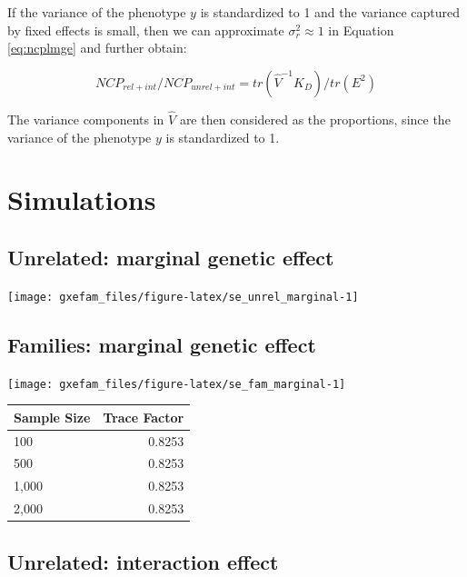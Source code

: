 \documentclass[]{book}
\begin{document}
If the variance of the phenotype \(y\) is standardized to 1 and the
variance captured by fixed effects is small, then we can approximate
\(\sigma_r^2 \approx 1\) in Equation \eqref{eq:ncplmge} and further
obtain:

\begin{equation}
NCP_{rel + int} / NCP_{unrel + int} = tr(\hat{V}^{-1} K_{D}) / tr(E^2)
\label{eq:ncpratiogesc}
\end{equation}

The variance components in \(\hat{V}\) are then considered as the
proportions, since the variance of the phenotype \(y\) is standardized
to 1.

\section{Simulations}\label{simulations}

\subsection{Unrelated: marginal genetic
effect}\label{unrelated-marginal-genetic-effect}

\begin{center}\texttt{[image: gxefam\_files/figure-latex/se\_unrel\_marginal-1]} \end{center}

\subsection{Families: marginal genetic
effect}\label{families-marginal-genetic-effect}

\begin{center}\texttt{[image: gxefam\_files/figure-latex/se\_fam\_marginal-1]} \end{center}

\begin{tabular}{l|r}
\hline
Sample Size & Trace Factor\\
\hline
100 & 0.8253\\
\hline
500 & 0.8253\\
\hline
1,000 & 0.8253\\
\hline
2,000 & 0.8253\\
\hline
\end{tabular}

\subsection{Unrelated: interaction
effect}\label{unrelated-interaction-effect}
\end{document}
